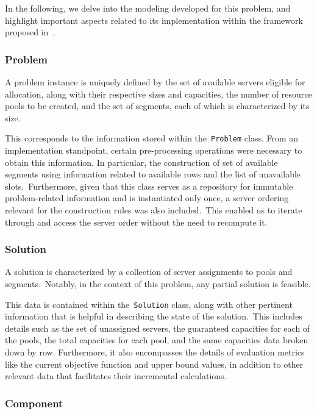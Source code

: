 In the following, we delve into the modeling developed for this problem, and
highlight important aspects related to its implementation within the framework
proposed in~.

\subsubsection*{Problem}

A problem instance is uniquely defined by the set of available servers eligible
for allocation, along with their respective sizes and capacities, the number of
resource pools to be created, and the set of segments, each of which is
characterized by its size.

This corresponds to the information stored within the~\texttt{Problem} class.
From an implementation standpoint, certain pre-processing operations were necessary to
obtain this information. In particular, the construction of set of available
segments using information related to available rows and the list of unavailable
slots.~Furthermore, given that this class serves as a repository for immutable
problem-related information and is instantiated only once, a server ordering
relevant for the construction rules was also included.~This enabled us to
iterate through and access the server order without the need to recompute it.

\subsubsection*{Solution}

A solution is characterized by a collection of server assignments to pools and
segments.~Notably, in the context of this problem, any partial solution is
feasible.

This data is contained within the~\texttt{Solution} class, along with other
pertinent information that is helpful in describing the state of the
solution.~This includes details such as the set of unassigned servers, the
guaranteed capacities for each of the pools, the total capacities for each pool,
and the same capacities data broken down by row. Furthermore, it also
encompasses the details of evaluation metrics like the current objective
function and upper bound values, in addition to other relevant data that
facilitates their incremental calculations.

\subsubsection*{Component}

